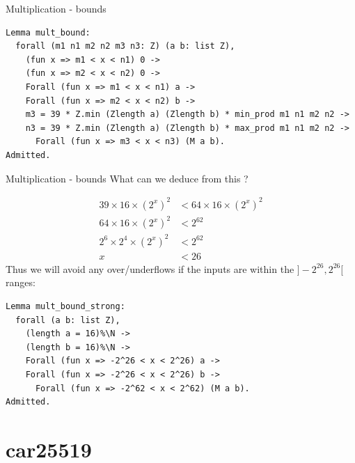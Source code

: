 \documentclass[8pt]{beamer}
\begin{document}
%
%

\begin{frame}[fragile]{Multiplication - bounds}
  \begin{center}
\begin{lstlisting}[language=Coq, caption=M | Proofs of bounds, label=cod:languageC141]
Lemma mult_bound:
  forall (m1 n1 m2 n2 m3 n3: Z) (a b: list Z),
    (fun x => m1 < x < n1) 0 ->
    (fun x => m2 < x < n2) 0 ->
    Forall (fun x => m1 < x < n1) a ->
    Forall (fun x => m2 < x < n2) b ->
    m3 = 39 * Z.min (Zlength a) (Zlength b) * min_prod m1 n1 m2 n2 ->
    n3 = 39 * Z.min (Zlength a) (Zlength b) * max_prod m1 n1 m2 n2 ->
      Forall (fun x => m3 < x < n3) (M a b).
Admitted.
\end{lstlisting}

  \end{center}
\end{frame}

\begin{frame}[fragile]{Multiplication - bounds}
  What can we deduce from this ?
  \begin{center}
  \begin{align*}
    39 \times 16 \times (2^x)^2 &< 64 \times 16 \times (2^x)^2\\
    64 \times 16 \times (2^x)^2 &< 2^{62}\\
    2^6 \times 2^4 \times (2^x)^2 &< 2^{62}\\
    x &< 26
  \end{align*}
  Thus we will avoid any over/underflows if the inputs are within the $]-2^{26},2^{26}[$ ranges:
 \begin{lstlisting}[language=Coq, caption=M | Proofs of bounds, label=cod:languageC141]
Lemma mult_bound_strong:
  forall (a b: list Z),
    (length a = 16)%\N ->
    (length b = 16)%\N ->
    Forall (fun x => -2^26 < x < 2^26) a ->
    Forall (fun x => -2^26 < x < 2^26) b ->
      Forall (fun x => -2^62 < x < 2^62) (M a b).
Admitted.
\end{lstlisting}

  \end{center}
\end{frame}

\section{car25519}

%
%
\end{document}
